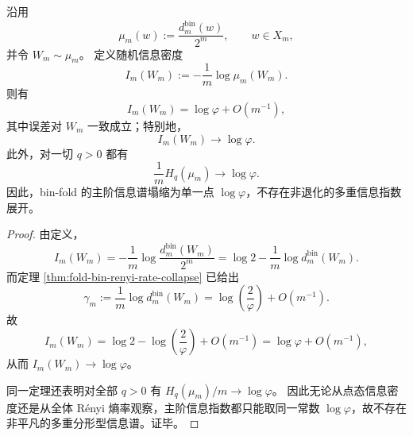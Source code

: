 \begin{theorem}\label{thm:xi-foldbin-information-spectrum-single-point-collapse}
沿用
\[
\mu_m(w):=\frac{d_m^{\mathrm{bin}}(w)}{2^m},
\qquad
w\in X_m,
\]
并令 \(W_m\sim\mu_m\)。
定义随机信息密度
\[
I_m(W_m):=-\frac{1}{m}\log \mu_m(W_m).
\]
则有
\[
I_m(W_m)=\log\varphi+O(m^{-1}),
\]
其中误差对 \(W_m\) 一致成立；特别地，
\[
I_m(W_m)\longrightarrow \log\varphi.
\]
此外，对一切 \(q>0\) 都有
\[
\frac{1}{m}H_q(\mu_m)\longrightarrow \log\varphi.
\]
因此，bin-fold 的主阶信息谱塌缩为单一点 \(\log\varphi\)，不存在非退化的多重信息指数展开。
\end{theorem}
\begin{proof}
由定义，
\[
I_m(W_m)
=
-\frac{1}{m}\log\frac{d_m^{\mathrm{bin}}(W_m)}{2^m}
=
\log 2-\frac{1}{m}\log d_m^{\mathrm{bin}}(W_m).
\]
而定理 \ref{thm:fold-bin-renyi-rate-collapse} 已给出
\[
\gamma_m:=\frac{1}{m}\log d_m^{\mathrm{bin}}(W_m)
=
\log\!\left(\frac{2}{\varphi}\right)+O(m^{-1}).
\]
故
\[
I_m(W_m)
=
\log 2-\log\!\left(\frac{2}{\varphi}\right)+O(m^{-1})
=
\log\varphi+O(m^{-1}),
\]
从而 \(I_m(W_m)\to\log\varphi\)。

同一定理还表明对全部 \(q>0\) 有
\(
H_q(\mu_m)/m\to\log\varphi
\)。
因此无论从点态信息密度还是从全体 Rényi 熵率观察，主阶信息指数都只能取同一常数 \(\log\varphi\)，故不存在非平凡的多重分形型信息谱。证毕。
\end{proof}
